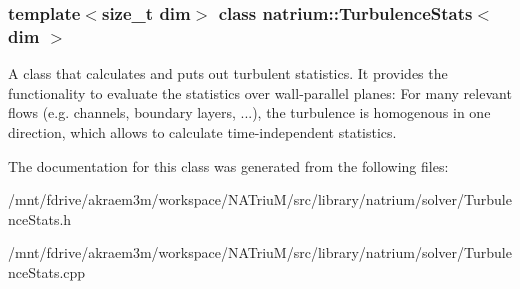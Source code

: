 \subsubsection*{template$<$size\_\-t dim$>$ class natrium::TurbulenceStats$<$ dim $>$}

A class that calculates and puts out turbulent statistics. It provides the functionality to evaluate the statistics over wall-\/parallel planes: For many relevant flows (e.g. channels, boundary layers, ...), the turbulence is homogenous in one direction, which allows to calculate time-\/independent statistics. 

The documentation for this class was generated from the following files:\begin{DoxyCompactItemize}
\item 
/mnt/fdrive/akraem3m/workspace/NATriuM/src/library/natrium/solver/TurbulenceStats.h\item 
/mnt/fdrive/akraem3m/workspace/NATriuM/src/library/natrium/solver/TurbulenceStats.cpp\end{DoxyCompactItemize}

